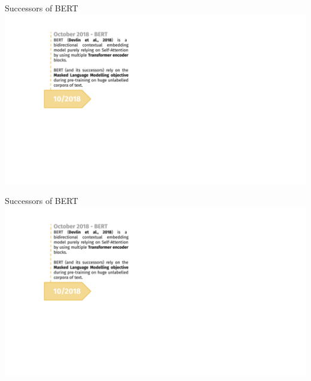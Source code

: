 \documentclass[]{beamer}
\begin{document}
\begin{frame}[noframenumbering]{Successors of BERT}
\hbox{\hspace{-4.5em} \includegraphics[width=14cm,page=4]{figure/transfer_learning_timeline2_nlp.pdf}}
\end{frame}
\begin{frame}[noframenumbering]{Successors of BERT}
\hbox{\hspace{-4.5em} \includegraphics[width=14cm,page=5]{figure/transfer_learning_timeline2_nlp.pdf}}
\end{frame}
\end{document}
